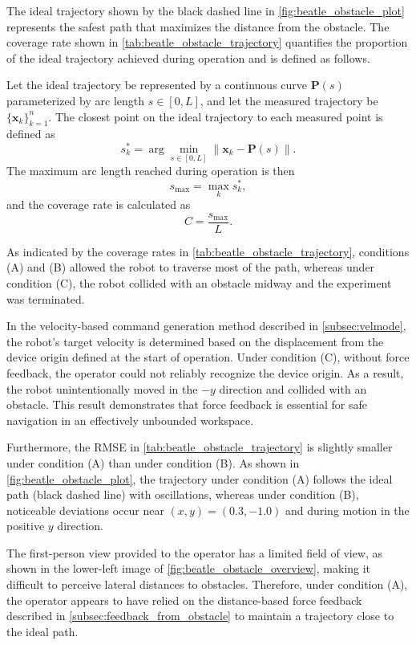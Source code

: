 \documentclass{WileyMSP-template}
\begin{document}
The ideal trajectory shown by the black dashed line in \ref{fig:beatle_obstacle_plot} represents the safest path that maximizes the distance from the obstacle.  
The coverage rate shown in \ref{tab:beatle_obstacle_trajectory} quantifies the proportion of the ideal trajectory achieved during operation and is defined as follows.

Let the ideal trajectory be represented by a continuous curve $\bm{P}(s)$ parameterized by arc length $s \in [0, L]$, and let the measured trajectory be $\{\bm{x}_k\}_{k=1}^{n}$.  
The closest point on the ideal trajectory to each measured point is defined as
\begin{equation}
  s_k^* = \arg \min_{s \in [0,L]} \left\| \bm{x}_k - \bm{P}(s) \right\|.
\end{equation}
The maximum arc length reached during operation is then
\begin{equation}
  s_{\text{max}} = \max_{k} s_k^*,
\end{equation}
and the coverage rate is calculated as
\begin{equation}
  C = \frac{s_{\text{max}}}{L}.
\end{equation}

As indicated by the coverage rates in \ref{tab:beatle_obstacle_trajectory}, conditions (A) and (B) allowed the robot to traverse most of the path, whereas under condition (C), the robot collided with an obstacle midway and the experiment was terminated.

In the velocity-based command generation method described in \ref{subsec:velmode}, the robot’s target velocity is determined based on the displacement from the device origin defined at the start of operation.  
Under condition (C), without force feedback, the operator could not reliably recognize the device origin.  
As a result, the robot unintentionally moved in the $-y$ direction and collided with an obstacle.  
This result demonstrates that force feedback is essential for safe navigation in an effectively unbounded workspace.

Furthermore, the RMSE in \ref{tab:beatle_obstacle_trajectory} is slightly smaller under condition (A) than under condition (B).  
As shown in \ref{fig:beatle_obstacle_plot}, the trajectory under condition (A) follows the ideal path (black dashed line) with oscillations, whereas under condition (B), noticeable deviations occur near $(x, y) = (0.3, -1.0)$ and during motion in the positive $y$ direction.

The first-person view provided to the operator has a limited field of view, as shown in the lower-left image of \ref{fig:beatle_obstacle_overview}, making it difficult to perceive lateral distances to obstacles.  
Therefore, under condition (A), the operator appears to have relied on the distance-based force feedback described in \ref{subsec:feedback_from_obstacle} to maintain a trajectory close to the ideal path.
\end{document}

